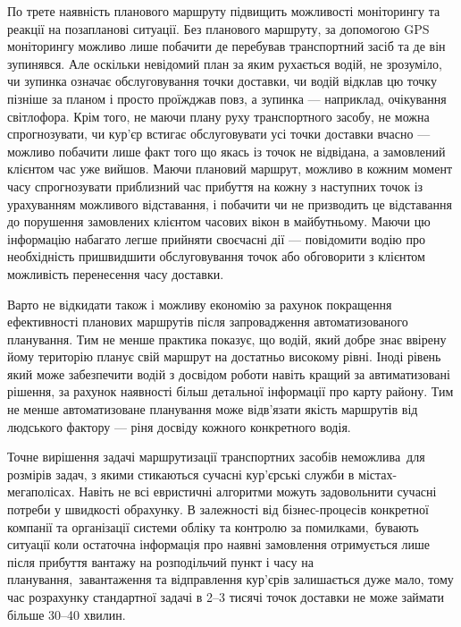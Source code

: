По трете наявність планового маршруту підвищить можливості моніторингу та реакції на позапланові ситуації. Без планового маршруту, за допомогою GPS моніторингу можливо лише побачити де перебував транспортний засіб та де він зупинявся. Але оскільки невідомий план за яким рухається водій, не зрозуміло, чи зупинка означає обслуговування точки доставки, чи водій відклав цю точку пізніше за планом і просто проїжджав повз, а зупинка --- наприклад, очікування світлофора. Крім того, не маючи плану руху транспортного засобу, не можна спрогнозувати, чи кур’єр встигає обслуговувати усі точки доставки вчасно --- можливо побачити лише факт того що якась із точок не відвідана, а замовлений клієнтом час уже вийшов. Маючи плановий маршрут, можливо в кожним момент часу спрогнозувати приблизний час прибуття на кожну з наступних точок із урахуванням можливого відставання, і побачити чи не призводить це відставання до порушення замовлених клієнтом часових вікон в майбутньому. Маючи цю інформацію набагато легше прийняти своєчасні дії --- повідомити водію про необхідність пришвидшити обслуговування точок або обговорити з клієнтом можливість перенесення часу доставки.

Варто не відкидати також і можливу економію за рахунок покращення ефективності планових маршрутів після запровадження автоматизованого планування. Тим не менше практика показує, що водій, який добре знає ввірену йому територію планує свій маршрут на достатньо високому рівні. Іноді рівень який може забезпечити водій з досвідом роботи навіть кращий за автиматизовані рішення, за рахунок наявності більш детальної інформації про карту району. Тим не менше автоматизоване планування може відв'язати якість маршрутів від людського фактору --- ріня досвіду кожного конкретного водія.

Точне вирішення задачі маршрутизації транспортних засобів неможлива для розмірів задач, з якими стикаються сучасні кур'єрські служби в містах-мегаполісах. Навіть не всі евристичні алгоритми можуть задовольнити сучасні потреби у швидкості обрахунку. В залежності від бізнес-процесів конкретної компанії та організації системи обліку та контролю за помилками, бувають ситуації коли остаточна інформація про наявні замовлення отримується лише після прибуття вантажу на розподільчий пункт і часу на планування, завантаження та відправлення кур'єрів залишається дуже мало, тому час розрахунку стандартної задачі в 2--3 тисячі точок доставки не може займати більше 30--40 хвилин.

